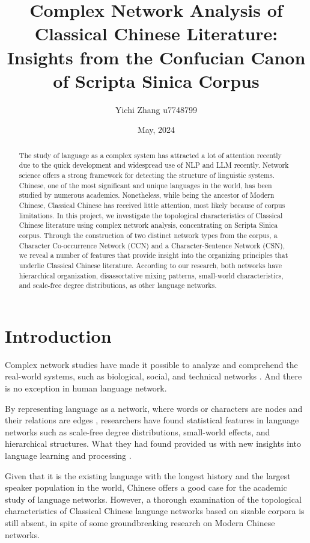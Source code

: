 \documentclass[11pt]{article}
\title{Complex Network Analysis of Classical Chinese Literature: Insights from the Confucian Canon of Scripta Sinica Corpus}
\author{Yichi Zhang u7748799}
\date{May, 2024}
\begin{document}
\maketitle

\begin{abstract}
    The study of language as a complex system has attracted a lot of attention recently due to the quick development and widespread use of NLP and LLM recently. Network science offers a strong framework for detecting the structure of linguistic systems. Chinese, one of the most significant and unique languages in the world, has been studied by numerous academics. Nonetheless, while being the ancestor of Modern Chinese, Classical Chinese has received little attention, most likely because of corpus limitations. In this project, we investigate the topological characteristics of Classical Chinese literature using complex network analysis, concentrating on Scripta Sinica corpus. Through the construction of two distinct network types from the corpus, a Character Co-occurrence Network (CCN) and a Character-Sentence Network (CSN), we reveal a number of features that provide insight into the organizing principles that underlie Classical Chinese literature. According to our research, both networks have hierarchical organization, disassortative mixing patterns, small-world characteristics, and scale-free degree distributions, as other language networks. 
\end{abstract}

\section{Introduction}
Complex network studies have made it possible to analyze and comprehend the real-world systems, such as biological, social, and technical networks \cite{costa2007characterization}. And there is no exception in human language network. 

By representing language as a network, where words or characters are nodes and their relations are edges \cite{ferrer2004patterns}, researchers have found statistical features in language networks such as scale-free degree distributions, small-world effects, and hierarchical structures. What they had found provided us with new insights into language learning and processing \cite{baronchelli2013networks}.

Given that it is the existing language with the longest history and the largest speaker population in the world, Chinese offers a good case for the academic study of language networks. 
However, a thorough examination of the topological characteristics of Classical Chinese language networks based on sizable corpora is still absent, in spite of some groundbreaking research on Modern Chinese networks\cite{LI2007629}.
\end{document}
